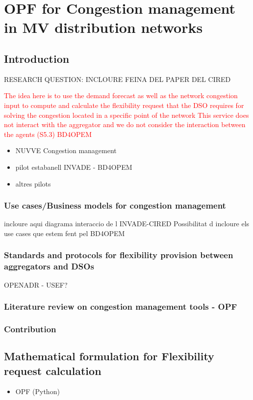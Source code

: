 \chapter{OPF for Congestion management in MV distribution networks}
\label{ChapterOPFDSO}

\section{Introduction}
RESEARCH QUESTION: INCLOURE FEINA DEL PAPER DEL CIRED

\textcolor{red}{The idea here is to use the demand forecast as well as the network congestion input to compute and calculate the flexibility request that the DSO requires for solving the congestion located in a specific point of the network}
\textcolor{red}{This service does not interact with the aggregator and we do not consider the interaction between the agents (S5.3) BD4OPEM}

\begin{itemize}
\item NUVVE Congestion management
\item pilot estabanell INVADE - BD4OPEM 
\item altres pilots
\end{itemize}

\subsection{Use cases/Business models for congestion management}
incloure aqui diagrama interaccio de l INVADE-CIRED
Possibilitat d incloure els use cases que estem fent pel BD4OPEM 

\subsection{Standards and protocols for flexibility provision between aggregators and DSOs}
OPENADR - USEF? 
\subsection{Literature review on congestion management tools - OPF}
\subsection{Contribution}


\section{Mathematical formulation for Flexibility request calculation}
\begin{itemize}
	\item OPF (Python)
\end{itemize}

